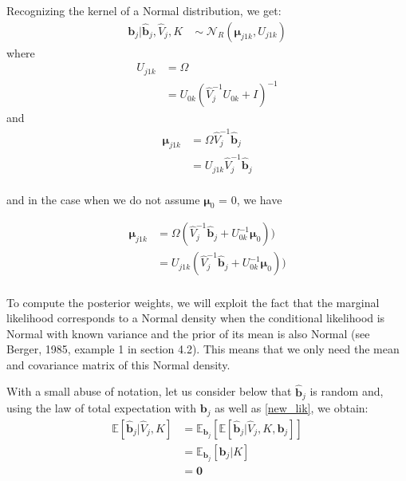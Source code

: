 \documentclass[11pt, oneside]{article}   	%
\newcommand{\Exp}{\mathbb{E}} %
\newcommand{\Norm}{{\mathcal{N}}} %
\begin{document}
Recognizing the kernel of a Normal distribution, we get:
\begin{equation}
  \label{post_b_jl}
  \begin{aligned}
    \bm{b}_{j} | \hat{\bm{b}}_{j}, \hat{V}_{j}, K \;  &\sim \; \Norm_R(\bm{\mu}_{j1k}, U_{j1k})
  \end{aligned}
\end{equation}
where
\begin{equation}
  \label{post_b_jl_covar}
  \begin{aligned}
    U_{j1k} &= \Omega \\
    &= U_{0k} \left( \hat{V}_{j}^{-1} U_{0k} + I \right)^{-1}
  \end{aligned}
\end{equation}
and
\begin{equation}
  \label{post_b_jl_mean}
  \begin{aligned}
    \bm{\mu}_{j1k} &= \Omega \hat{V}_{j}^{-1} \hat{\bm{b}}_{j} \\
    &= U_{j1k} \hat{V}_{j}^{-1} \hat{\bm{b}}_{j} \\
  \end{aligned}
\end{equation}

and in the case when we do not assume $\bm{\mu}_{0}$ = 0, we have 


\begin{equation}
  \label{post_b_k_mean_notnull}
  \begin{aligned}
    \bm{\mu}_{j1k} &= \Omega (\hat{V}_{j}^{-1} \hat{\bm{b}}_{j} + U_{0k}^{-1} \bm{\mu}_{0})) \\
    &= U_{j1k}  (\hat{V}_{j}^{-1} \hat{\bm{b}}_{j} + U_{0k}^{-1} \bm{\mu}_{0})) \\
  \end{aligned}
\end{equation}


To compute the posterior weights, we will exploit the fact that the marginal likelihood corresponds to a Normal density when the conditional likelihood is Normal with known variance and the prior of its mean is also Normal (see Berger, 1985, example 1 in section 4.2).
This means that we only need the mean and covariance matrix of this Normal density.

With a small abuse of notation, let us consider below that $\hat{\bm{b}}_{j}$ is random and, using the law of total expectation with $\bm{b}_{j}$ as well as \ref{new_lik}, we obtain:
\begin{equation}
  \begin{aligned}
    \Exp[\hat{\bm{b}}_{j} | \hat{V}_{j}, K] &= \Exp_{\bm{b}_{j}}[ \Exp[\hat{\bm{b}}_{j} | \hat{V}_{j}, K, \bm{b}_{j}] ]\\
    &= \Exp_{\bm{b}_{j}}[\bm{b}_{j} | K] \\
    &= \bm{0}
  \end{aligned}
\end{equation}
\end{document}
